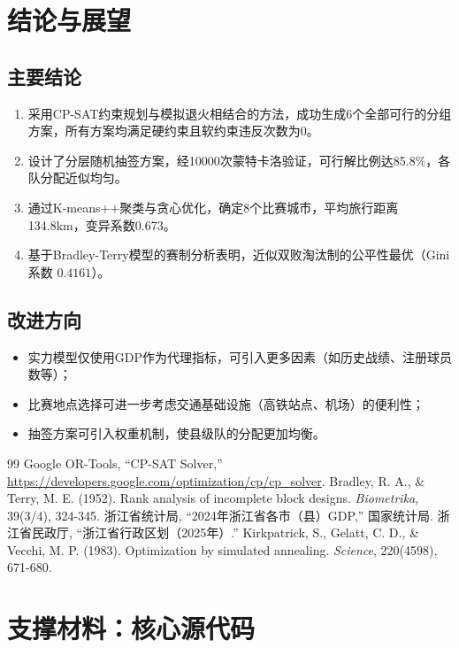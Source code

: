 \documentclass[a4paper,12pt]{article}
\begin{document}
\section{结论与展望}

\subsection{主要结论}
\begin{enumerate}
    \item 采用CP-SAT约束规划与模拟退火相结合的方法，成功生成6个全部可行的分组方案，所有方案均满足硬约束且软约束违反次数为0。
    \item 设计了分层随机抽签方案，经10000次蒙特卡洛验证，可行解比例达85.8\%，各队分配近似均匀。
    \item 通过K-means++聚类与贪心优化，确定8个比赛城市，平均旅行距离134.8km，变异系数0.673。
    \item 基于Bradley-Terry模型的赛制分析表明，近似双败淘汰制的公平性最优（Gini系数 $0.4161$）。
\end{enumerate}

\subsection{改进方向}
\begin{itemize}
    \item 实力模型仅使用GDP作为代理指标，可引入更多因素（如历史战绩、注册球员数等）；
    \item 比赛地点选择可进一步考虑交通基础设施（高铁站点、机场）的便利性；
    \item 抽签方案可引入权重机制，使县级队的分配更加均衡。
\end{itemize}

\begin{thebibliography}{99}
 Google OR-Tools, ``CP-SAT Solver,'' \url{https://developers.google.com/optimization/cp/cp_solver}.
 Bradley, R. A., \& Terry, M. E. (1952). Rank analysis of incomplete block designs. \textit{Biometrika}, 39(3/4), 324-345.
 浙江省统计局, ``2024年浙江省各市（县）GDP,'' 国家统计局.
 浙江省民政厅, ``浙江省行政区划（2025年）.''
 Kirkpatrick, S., Gelatt, C. D., \& Vecchi, M. P. (1983). Optimization by simulated annealing. \textit{Science}, 220(4598), 671-680.
\end{thebibliography}

\appendix
\section{支撑材料：核心源代码}



\end{document}
